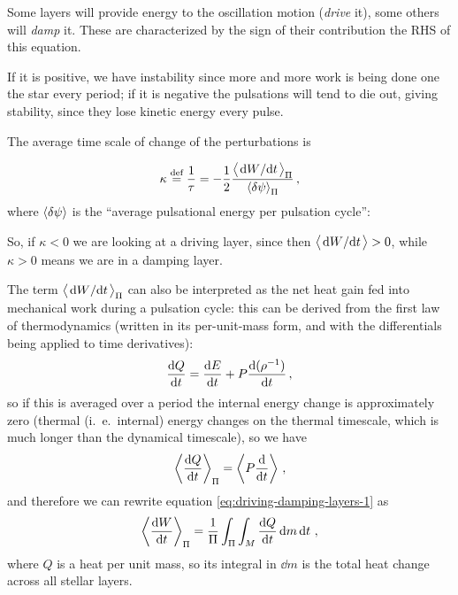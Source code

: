 \documentclass[main.tex]{subfiles}
\begin{document}
Some layers will provide energy to the oscillation motion (\emph{drive} it), some others will \emph{damp} it.
These are characterized by the sign of their contribution the RHS of this equation.

If it is positive, we have instability since more and more work is being done one the star every period; if it is negative the pulsations will tend to die out, giving stability, since they lose kinetic energy every pulse.

The average time scale of change of the perturbations is

\begin{equation}
  \kappa \defeq \frac{1}{\tau} = -\frac{1}{2} \frac{\expval{\dv*{W}{t}}_\Pi}{\expval{ \delta \psi}_\Pi }
\,,
\end{equation}
%
where \(\expval{ \delta \psi }\) is the ``average pulsational energy per pulsation cycle'': 

So, if \(\kappa < 0\) we are looking at a driving layer, since then \(\expval{ \dv*{W}{t}} >0\), while \(\kappa > 0\) means we are in a damping layer. 

The term \(\expval{\dv*{W}{t}}_\Pi \) can also be interpreted as the net heat gain fed into mechanical work during a pulsation cycle: this can be derived from the first law of thermodynamics (written in its per-unit-mass form, and with the differentials being applied to time derivatives): 
%
\begin{align}
\dv{Q}{t} = \dv{E}{t} + P \dv{(\rho^{-1})}{t}
\,,
\end{align}
%
so if this is averaged over a period the internal energy change is approximately zero (thermal (i.\ e.\ internal) energy changes on the thermal timescale, which is much longer than the dynamical timescale), so we have 
%
\begin{align}
\expval{\dv{Q}{t}}_{\Pi } = \expval{P \dv{}{t} (\rho^{-1})}
\,,
\end{align}
%
and therefore we can rewrite equation \eqref{eq:driving-damping-layers-1} as 
%
\begin{align}
\expval{\dv{W}{t}}_{\Pi } = \frac{1}{\Pi } \int_{\Pi } \int_{M} \dv{Q}{t} \dd{m} \dd{t}
\,,
\end{align}
%
where \(Q\) is a heat per unit mass, so its integral in \(\dd{m}\) is the total heat change across all stellar layers.
\end{document}
